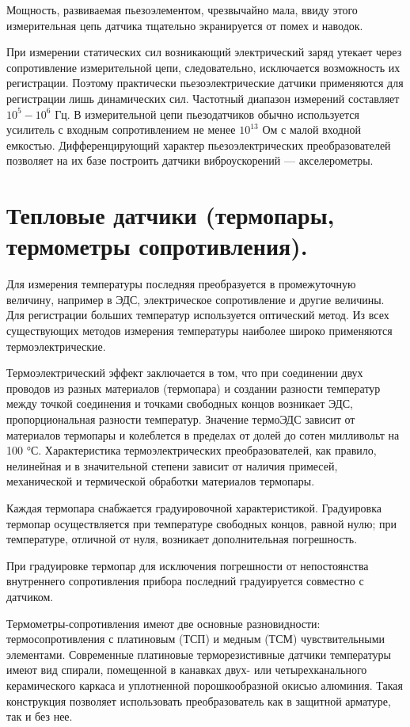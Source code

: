 \documentclass[unicode, 12pt, a4paper, oneside]{article}
\begin{document}
Мощность, развиваемая пьезоэлементом, чрезвычайно мала, ввиду этого измерительная цепь датчика тщательно экранируется от помех и наводок.

При измерении статических сил возникающий электрический заряд утекает через сопротивление измерительной цепи, следовательно, исключается возможность их регистрации. Поэтому практически пьезоэлектрические датчики применяются для регистрации лишь динамических сил. Частотный диапазон измерений составляет $10^5-10^6$  Гц.
В измерительной цепи пьезодатчиков обычно используется усилитель с входным сопротивлением не менее $10^{13}$ Ом с малой входной емкостью. Дифференцирующий характер пьезоэлектрических  преобразователей позволяет на их базе построить датчики виброускорений — акселерометры.

\section{Тепловые датчики (термопары, термометры сопротивления).}

Для измерения температуры последняя преобразуется в промежуточную величину, например в ЭДС, электрическое сопротивление и другие величины. Для регистрации больших температур используется оптический метод. Из всех существующих методов измерения температуры наиболее широко применяются термоэлектрические.

Термоэлектрический эффект заключается в том, что при соединении двух проводов из разных материалов (термопара) и создании разности температур между точкой соединения и точками свободных концов возникает ЭДС, пропорциональная разности температур. Значение термоЭДС зависит от материалов термопары и колеблется в пределах от долей до сотен милливольт на 100 °С. Характеристика термоэлектрических преобразователей, как правило, нелинейная и в значительной степени зависит от наличия примесей, механической и термической обработки материалов термопары.

Каждая термопара снабжается градуировочной характеристикой. Градуировка термопар осуществляется при температуре свободных концов, равной нулю; при температуре, отличной от нуля, возникает дополнительная погрешность.

При градуировке термопар для исключения погрешности от непостоянства внутреннего сопротивления прибора последний градуируется совместно с датчиком.

Термометры-сопротивления имеют две основные разновидности: термосопротивления с платиновым (ТСП) и медным (ТСМ) чувствительными элементами. Современные платиновые терморезистивные датчики температуры имеют вид спирали, помещенной в канавках двух- или четырехканального керамического каркаса и уплотненной порошкообразной окисью алюминия. Такая конструкция позволяет использовать преобразователь как в защитной арматуре, так и без нее.
\end{document}
